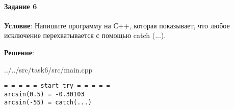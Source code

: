\paragraph{Задание 6} \hspace{0pt}

\textbf{Условие}:
Напишите программу на С++, которая показывает, что любое исключение перехватывается с помощью catch (...).

\textbf{Решение}:


{../../src/task6/src/main.cpp}

\begin{lstlisting}[language=Out,]
= = = = = start try = = = = =
arcsin(0.5) = -0.30103
arcsin(-55) = catch(...)
\end{lstlisting}